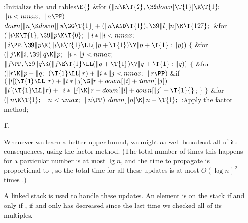 \Y\B\4:Initialize the  and  tables\X${}\E{}$\6
\&{for} ${}(\|n\K\T{2},\39\\{down}[\T{1}]\K\T{1};{}$ ${}\|n<\\{nmax};{}$ ${}\|n%
\PP){}$\1\5
${}\\{down}[\|n]\K\\{down}[\|n\GG\T{1}]+(\|n\AND\T{1}),\39\|l[\|n]\K\T{127};{}$%
\2\6
\&{for} ${}(\|i\K\T{1},\39\|p\K\T{0};{}$ ${}\|i*\|i<\\{nmax};{}$ ${}\|i\PP,\39%
\|p\K(\|i\E\T{1}\LL(\|p+\T{1})\?\|p+\T{1}:\|p)){}$\5
${}\{{}$\1\6
\&{for} ${}(\|j\K\|i,\39\|q\K\|p;{}$ ${}\|i*\|j<\\{nmax};{}$ ${}\|j\PP,\39\|q%
\K(\|j\E\T{1}\LL(\|q+\T{1})\?\|q+\T{1}:\|q)){}$\5
${}\{{}$\1\6
\&{for} ${}(\|r\K\|p+\|q;{}$ ${}(\T{1}\LL\|r)+\|i*\|j<\\{nmax};{}$ ${}\|r%
\PP){}$\1\6
\&{if} ${}(\|l[(\T{1}\LL\|r)+\|i*\|j]\G\|r+\\{down}[\|i]+\\{down}[\|j]){}$\1\5
${}\|l[(\T{1}\LL\|r)+\|i*\|j]\K\|r+\\{down}[\|i]+\\{down}[\|j]-\T{1}{}$;\2\2\6
\4${}\}{}$\2\6
\4${}\}{}$\2\6
\&{for} ${}(\|n\K\T{1};{}$ ${}\|n<\\{nmax};{}$ ${}\|n\PP){}$\1\5
${}\\{down}[\|n]\K\|n-\T{1};{}$\2\6
:Apply the factor method\X;\par
\U1.\fi

Whenever we learn a better upper bound, we might as well broadcast all
of its consequences, using the factor method. (The total number of
times this happens for a particular number  is at most $\lg n$,
and the time to propagate is proportional to , so the
total time for all these updates is at most $O(\log n)^2$ times .)

A linked stack is used to handle these updates. An element  is on the
stack if and only if , if and only  has
decreased
since the last time we checked all of its multiples.

